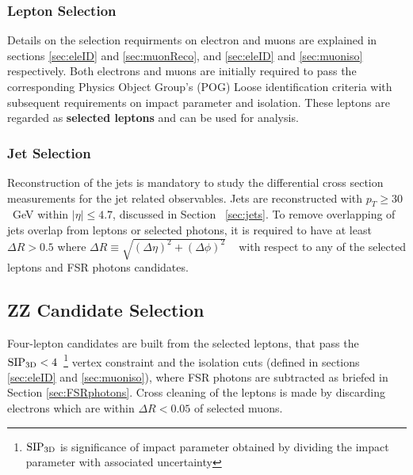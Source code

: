 \subsubsection{Lepton Selection}
Details on the selection requirments on electron and muons are explained in sections \ref{sec:eleID} and  \ref{sec:muonReco}, and \ref{sec:eleID} and \ref{sec:muoniso} respectively. Both electrons and muons are initially required to pass the corresponding Physics Object Group's (POG) Loose identification criteria with subsequent requirements on impact parameter and isolation. These leptons are regarded as {\bf selected leptons} and can be used for analysis.


\subsubsection{Jet Selection}
\par Reconstruction of the jets is mandatory to study the differential cross section measurements for the jet related observables.
Jets are reconstructed with $p_T \ge 30$~GeV within $|\eta|\le 4.7$, discussed in Section ~\ref{sec:jets}. To remove overlapping of jets overlap from leptons or selected photons, it is required to have at least  $\Delta R > 0.5$ where $\Delta R \equiv \sqrt{(\Delta \eta)^2+ (\Delta \phi)^2}$ ~\cite{Chatrchyan:2013mx} with respect to any of the selected leptons and FSR photons candidates.

\subsection{ZZ Candidate Selection}
\label{sec:zzcandsel}

Four-lepton candidates are built from the selected leptons, %
that pass the ${\rm SIP_{3D}} < 4$~\footnote{${\rm SIP_{3D}}$ is significance of impact parameter obtained by dividing the impact parameter with associated uncertainty} vertex constraint
and the isolation cuts (defined in sections \ref{sec:eleID} and \ref{sec:muoniso}),
where FSR photons are subtracted as briefed in Section \ref{sec:FSRphotons}.
Cross cleaning of the leptons is made
by discarding electrons which are within $\Delta R < 0.05$ of selected muons.


